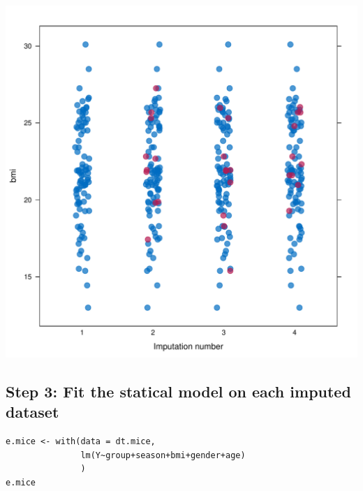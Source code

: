 \documentclass[12pt]{article}
\begin{document}
\begin{center}
\includegraphics[width=.9\linewidth]{./striplotImputed.pdf}
\end{center}

\clearpage

\subsection{Step 3: Fit the statical model on each imputed dataset}
\label{sec:orge0e1b9a}

\lstset{language=r,label= ,caption= ,captionpos=b,numbers=none}
\begin{lstlisting}
e.mice <- with(data = dt.mice,
			   lm(Y~group+season+bmi+gender+age)
			   )
e.mice
\end{lstlisting}
\end{document}
